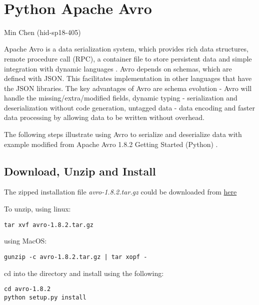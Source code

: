 \MDNAME\

\section{Python Apache Avro}

Min Chen (hid-sp18-405)

Apache Avro is a data serialization system, which provides rich data
structures, remote procedure call (RPC), a container file to store
persistent data and simple integration with dynamic languages
\cite{hid-sp18-405-tutorial-avro-doc}. Avro depends on schemas, which
are defined with JSON. This facilitates implementation in other
languages that have the JSON libraries. The key advantages of Avro are
schema evolution - Avro will handle the missing/extra/modified fields,
dynamic typing - serialization and deserialization without code
generation, untagged data - data encoding and faster data processing by
allowing data to be written without overhead.

The following steps illustrate using Avro to serialize and deserialize
data with example modified from Apache Avro 1.8.2 Getting Started
(Python) \cite{hid-sp18-405-tutorial-avro-python}.

\subsection{Download, Unzip and Install}

The zipped installation file \emph{avro-1.8.2.tar.gz} could be
downloaded from
\href{http://mirrors.ocf.berkeley.edu/apache/avro/avro-1.8.2/py/}{here}

To unzip, using linux:

\begin{lstlisting}
tar xvf avro-1.8.2.tar.gz
\end{lstlisting}

using MacOS:

\begin{lstlisting}
gunzip -c avro-1.8.2.tar.gz | tar xopf -
\end{lstlisting}

cd into the directory and install using the following:

\begin{lstlisting}
cd avro-1.8.2
python setup.py install
\end{lstlisting}

